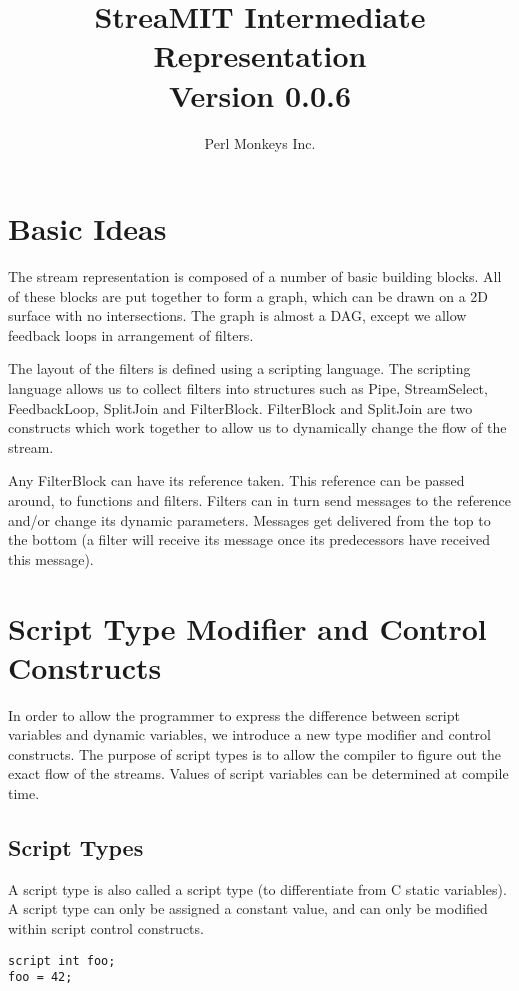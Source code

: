 \documentclass[twocolumn, draft]{article}
\title{StreaMIT Intermediate Representation \\ Version 0.0.6}
\author{Perl Monkeys Inc.}
\begin{document}
\maketitle

\section{Basic Ideas}

The stream representation is composed of a number of basic building blocks.
All of these blocks are put together to form a graph, which can be drawn
on a 2D surface with no intersections.  The graph is almost a DAG, except
we allow feedback loops in arrangement of filters.

The layout of the filters is defined using a scripting language.  The scripting
language allows us to collect filters into structures such as Pipe,
StreamSelect, FeedbackLoop, SplitJoin and FilterBlock.  FilterBlock and 
SplitJoin are two constructs which work together to allow us to dynamically
change the flow of the stream.

Any FilterBlock can have its reference taken.  This reference can be passed
around, to functions and filters.  Filters can in turn send messages to
the reference and/or change its dynamic parameters.  Messages get delivered
from the top to the bottom (a filter will receive its message once its
predecessors have received this message).

\section{Script Type Modifier and Control Constructs}

In order to allow the programmer to express the difference between
script variables and dynamic variables, we introduce a new type modifier
and control constructs.  The purpose of script types is to allow the compiler
to figure out the exact flow of the streams.  Values of script variables
can be determined at compile time.

\subsection{Script Types}

A script type is also called a script type (to differentiate from C static
variables).  A script type can only be assigned a constant value, and can
only be modified within script control constructs.

\begin{verbatim}
script int foo;
foo = 42;
\end{verbatim}
\end{document}
